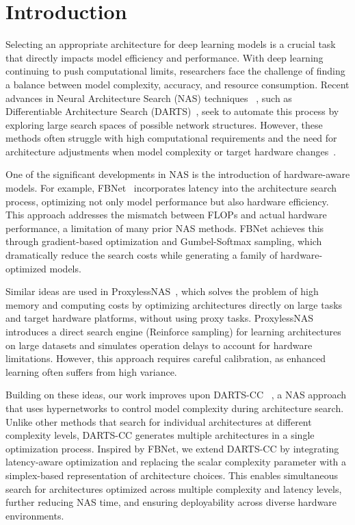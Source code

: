 \documentclass{article}
\begin{document}
\section{Introduction}

Selecting an appropriate architecture for deep learning models is a crucial task that directly impacts model efficiency and performance. With deep learning continuing to push computational limits, researchers face the challenge of finding a balance between model complexity, accuracy, and resource consumption. Recent advances in Neural Architecture Search (NAS) techniques ~\cite{nas}, such as Differentiable Architecture Search (DARTS)~\cite{liu2019darts}, seek to automate this process by exploring large search spaces of possible network structures. However, these methods often struggle with high computational requirements and the need for architecture adjustments when model complexity or target hardware changes~\cite{yakovlev2021neural}. %

One of the significant developments in NAS is the introduction of hardware-aware models. For example, FBNet~\cite{Wu_2019_CVPR} incorporates latency into the architecture search process, optimizing not only model performance but also hardware efficiency. This approach addresses the mismatch between FLOPs and actual hardware performance, a limitation of many prior NAS methods. FBNet achieves this through gradient-based optimization and Gumbel-Softmax sampling, which dramatically reduce the search costs while generating a family of hardware-optimized models.

Similar ideas are used in ProxylessNAS~\cite{proxylessnas}, which solves the problem of high memory and computing costs by optimizing architectures directly on large tasks and target hardware platforms, without using proxy tasks. ProxylessNAS introduces a direct search engine (Reinforce sampling) for learning architectures on large datasets and simulates operation delays to account for hardware limitations. However, this approach requires careful calibration, as enhanced learning often suffers from high variance.

Building on these ideas, our work improves upon DARTS-CC~\cite{yakovlev2021neural} %
, a NAS approach that uses hypernetworks to control model complexity during architecture search. Unlike other methods that search for individual architectures at different complexity levels, DARTS-CC generates multiple architectures in a single optimization process. Inspired by FBNet, we extend DARTS-CC by integrating latency-aware optimization and replacing the scalar complexity parameter with a simplex-based representation of architecture choices. This enables simultaneous search for architectures optimized across multiple complexity and latency levels, further reducing NAS time, and ensuring deployability across diverse hardware environments.
\end{document}
